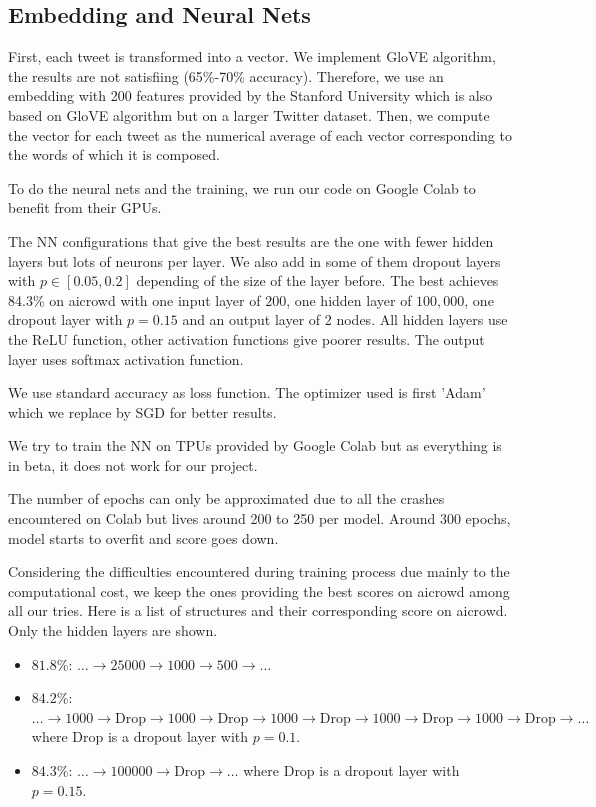 \documentclass[11pt, a4paper, twocolumn]{article}
\begin{document}
\subsection{Embedding and Neural Nets}
First, each tweet is transformed into a vector. We implement
GloVE algorithm, the results are not satisfiing (65\%-70\% accuracy). Therefore, we use an embedding with 200 features
provided by the Stanford University which is also based on GloVE algorithm but on a larger Twitter dataset\cite{glovepaper, gloveembedding}. 
Then, we compute the vector for each tweet as the numerical average of each vector corresponding to the 
words of which it is composed.

To do the neural nets and the training, we run our code on Google Colab to benefit from their GPUs.

The NN configurations that give the best results are the one with 
fewer hidden layers but lots of neurons per layer. We also add in some of them dropout layers with $p\in [0.05, 0.2]$ 
depending of the size of the layer before\cite{dropoutkeras}.
The best achieves 84.3\% on aicrowd with one input layer of $200$, one hidden layer of $100,000$, one dropout 
layer with $p=0.15$ and an output layer of 2 nodes. All hidden layers use the ReLU function, other activation functions give poorer results. The output layer uses softmax activation function.

We use standard accuracy as loss function. The optimizer used is first 'Adam' which we replace by SGD for better results.

We try to train the NN on TPUs provided by Google Colab but as everything is in beta, it does not work for our project.

The number of epochs can only be approximated due to all the crashes encountered on Colab but lives around 200 to 250 per model. Around 300 epochs, model starts to overfit and score goes down.

Considering the difficulties encountered during training process due mainly to the computational cost, we keep the ones providing the best scores on aicrowd among all our tries. 
Here is a list of structures and their corresponding score on aicrowd. Only the hidden layers are shown.
\begin{itemize}
  \item \textbf{$81.8\%$}: $\dots \rightarrow 25000\rightarrow 1000\rightarrow 500\rightarrow \dots$
  \item \textbf{$84.2\%$}: $\dots \rightarrow 1000\rightarrow \text{Drop}\rightarrow 1000
  \rightarrow \text{Drop}\rightarrow 1000\rightarrow \text{Drop}\rightarrow 1000
  \rightarrow \text{Drop}\rightarrow 1000\rightarrow \text{Drop}\rightarrow \dots$ where Drop is a dropout layer with $p=0.1$.
  \item \textbf{$84.3\%$}: $\dots \rightarrow 100000\rightarrow \text{Drop}\rightarrow \dots$ where Drop is a dropout layer with $p=0.15$. 
\end{itemize}
\end{document}
